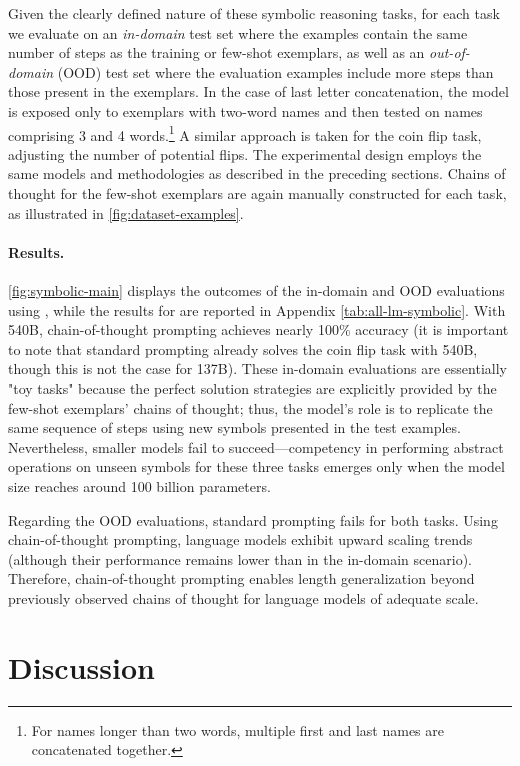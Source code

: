 Given the clearly defined nature of these symbolic reasoning tasks, for each task we evaluate on an \textit{in-domain} test set where the examples contain the same number of steps as the training or few-shot exemplars, as well as an \textit{out-of-domain} (OOD) test set where the evaluation examples include more steps than those present in the exemplars. In the case of last letter concatenation, the model is exposed only to exemplars with two-word names and then tested on names comprising 3 and 4 words.\footnote{For names longer than two words, multiple first and last names are concatenated together.} A similar approach is taken for the coin flip task, adjusting the number of potential flips. The experimental design employs the same models and methodologies as described in the preceding sections. Chains of thought for the few-shot exemplars are again manually constructed for each task, as illustrated in \cref{fig:dataset-examples}.

\paragraph{Results.}
\cref{fig:symbolic-main} displays the outcomes of the in-domain and OOD evaluations using \palm{}, while the results for \lamda{} are reported in Appendix \cref{tab:all-lm-symbolic}. With \palm{} 540B, chain-of-thought prompting achieves nearly 100\% accuracy (it is important to note that standard prompting already solves the coin flip task with \palm{} 540B, though this is not the case for \lamda{} 137B). These in-domain evaluations are essentially "toy tasks" because the perfect solution strategies are explicitly provided by the few-shot exemplars’ chains of thought; thus, the model’s role is to replicate the same sequence of steps using new symbols presented in the test examples. Nevertheless, smaller models fail to succeed—competency in performing abstract operations on unseen symbols for these three tasks emerges only when the model size reaches around 100 billion parameters.

Regarding the OOD evaluations, standard prompting fails for both tasks. Using chain-of-thought prompting, language models exhibit upward scaling trends (although their performance remains lower than in the in-domain scenario). Therefore, chain-of-thought prompting enables length generalization beyond previously observed chains of thought for language models of adequate scale.

\section{Discussion}\label{sec:discussion}

